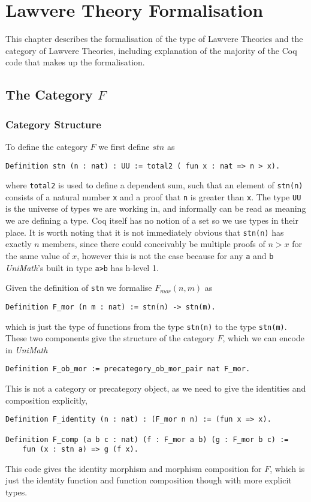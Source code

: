 \chapter{Lawvere Theory Formalisation}
This chapter describes the formalisation of the type of Lawvere Theories and the
category of Lawvere Theories, including explanation of the majority of the Coq
code that makes up the formalisation.

\section{The Category $F$}
\subsection{Category Structure}
To define the category $F$ we first define $stn$ as
\begin{lstlisting}
Definition stn (n : nat) : UU := total2 ( fun x : nat => n > x).
\end{lstlisting}
where \lstinline|total2| is used to define a dependent sum, such that an element of
\lstinline|stn(n)| consists of a natural number \lstinline|x| and a proof that \lstinline|n| is
greater than \lstinline|x|. The type \lstinline|UU| is the universe of types we are
working in, and informally can be read as meaning we are defining a type. Coq
itself has no notion of a set so we use types in their place. It is worth
noting that it is not immediately obvious that \lstinline|stn(n)| has exactly $n$
members, since there could conceivably be multiple proofs of $n>x$ for the same
value of $x$, however this is not the case because for any \lstinline|a| and \lstinline|b|
\textit{UniMath}'s built in type \lstinline|a>b| has h-level 1.

Given the definition of \lstinline|stn| we formalise $F_{mor}(n,m)$ as
\begin{lstlisting}
Definition F_mor (n m : nat) := stn(n) -> stn(m).
\end{lstlisting}
which is just the type of functions from the type \lstinline|stn(n)| to the type
\lstinline|stn(m)|. These two components give the structure of the category $F$,
which we can encode in \textit{UniMath}
\begin{lstlisting}
Definition F_ob_mor := precategory_ob_mor_pair nat F_mor.
\end{lstlisting}

This is not a category or precategory object, as we need to give the identities
and composition explicitly,
\begin{lstlisting}
Definition F_identity (n : nat) : (F_mor n n) := (fun x => x).

Definition F_comp (a b c : nat) (f : F_mor a b) (g : F_mor b c) :=
    fun (x : stn a) => g (f x).
\end{lstlisting}
This code gives the identity morphism and morphism composition for $F$, which is
just the identity function and function composition though with more explicit
types.

